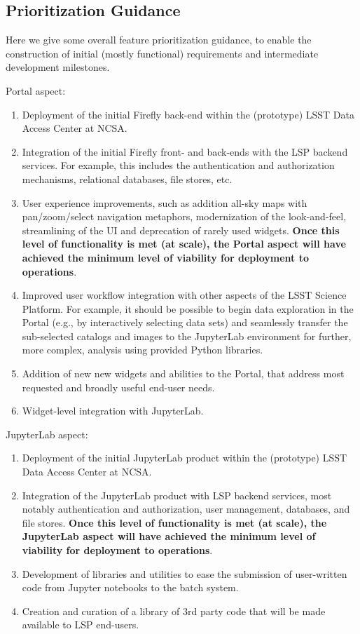\documentclass[DM,lsstdraft,toc]{lsstdoc}
\begin{document}
\subsection{Prioritization Guidance}

Here we give some overall feature prioritization guidance, to enable the construction of initial (mostly functional) requirements and intermediate development milestones.

Portal aspect:
\begin{enumerate}
	\item Deployment of the initial Firefly back-end within the (prototype) LSST Data Access Center at NCSA.
	\item Integration of the initial Firefly front- and back-ends with the LSP backend services. For example, this includes the authentication and authorization mechanisms, relational databases, file stores, etc.
	\item User experience improvements, such as addition all-sky maps with pan/zoom/select navigation metaphors, modernization of the look-and-feel, streamlining of the UI and deprecation of rarely used widgets. {\bf Once this level of functionality is met (at scale), the Portal aspect will have achieved the minimum level of viability for deployment to operations}.
	\item Improved user workflow integration with other aspects of the LSST Science Platform. For example, it should be possible to begin data exploration in the Portal (e.g., by interactively selecting data sets) and seamlessly transfer the sub-selected catalogs and images to the JupyterLab environment for further, more complex, analysis using provided Python libraries.
	\item Addition of new new widgets and abilities to the Portal, that address most requested and broadly useful end-user needs.
	\item Widget-level integration with JupyterLab.
\end{enumerate}

JupyterLab aspect:
\begin{enumerate}
	\item Deployment of the initial JupyterLab product within the (prototype) LSST Data Access Center at NCSA.
	\item Integration of the JupyterLab product with LSP backend services, most notably authentication and authorization, user management, databases, and file stores. {\bf Once this level of functionality is met (at scale), the JupyterLab aspect will have achieved the minimum level of viability for deployment to operations}.
	\item Development of libraries and utilities to ease the submission of user-written code from Jupyter notebooks to the batch system.
	\item Creation and curation of a library of 3rd party code that will be made available to LSP end-users.
\end{enumerate}
\end{document}
